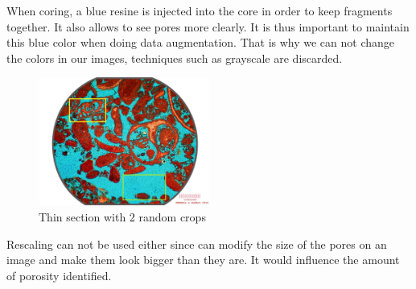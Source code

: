 When coring, a blue resine is injected into the core in order to keep fragments together. It also allows to see pores more clearly. It is thus important to maintain this blue color when doing data augmentation. That is why we can not change the colors in our images, techniques such as grayscale are discarded.

\begin{figure}[h]
    \centering
        \includegraphics[width=0.5\textwidth]{./figures/03-cropping_example_with2crops}
        \caption{Thin section with 2 random crops}\label{fig:crops}
\end{figure}

Rescaling can not be used either since can modify the size of the pores on an image and make them look bigger than they are. It would influence the amount of porosity identified.


